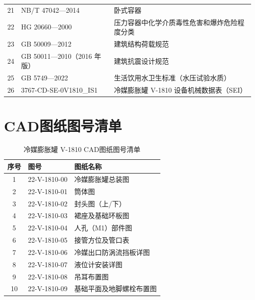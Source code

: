 \begin{table}[htbp]
\begin{tabularx}{\textwidth}{@{}c l >{\raggedright\arraybackslash}X @{}}
    21 & NB/T 47042—2014                & 卧式容器 \\
    22 & HG 20660—2000                  & 压力容器中化学介质毒性危害和爆炸危险程度分类 \\
    23 & GB 50009—2012                  & 建筑结构荷载规范 \\
    24 & GB 50011—2010（2016 年版）     & 建筑抗震设计规范 \\
    25 & GB 5749—2022                   & 生活饮用水卫生标准（水压试验水质） \\
    26 & 3767-CD-SE-0V1810\_IS1         & 冷媒膨胀罐 V-1810 设备机械数据表（SEI） \\
    \bottomrule
  \end{tabularx}
\end{table}

\section{CAD图纸图号清单}
\label{sec:cad-drawing-list}

\begin{table}[htbp]
  \centering
  \caption{冷媒膨胀罐 V-1810 CAD图纸图号清单}
  \label{tab:cad-drawing-numbers}
  \small\renewcommand{\arraystretch}{1.2}
  \setlength{\tabcolsep}{8pt}
  \begin{tabularx}{\textwidth}{@{}c l >{\raggedright\arraybackslash}X @{}}
    \toprule
    \textbf{序号} & \textbf{图号} & \textbf{图纸名称} \\
    \midrule
    1 & 22-V-1810-00 & 冷媒膨胀罐总装图 \\
    2 & 22-V-1810-01 & 筒体图 \\
    3 & 22-V-1810-02 & 封头图（上/下） \\
    4 & 22-V-1810-03 & 裙座及基础环板图 \\
    5 & 22-V-1810-04 & 人孔（M1）部件图 \\
    6 & 22-V-1810-05 & 接管方位及管口表 \\
    7 & 22-V-1810-06 & 冷媒出口防涡流挡板详图 \\
    8 & 22-V-1810-07 & 液位计安装详图 \\
    9 & 22-V-1810-08 & 吊耳布置图 \\
    10 & 22-V-1810-09 & 基础平面及地脚螺栓布置图 \\
    \bottomrule
  \end{tabularx}
\end{table}
